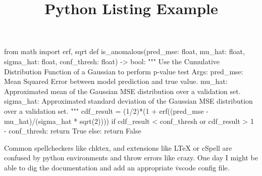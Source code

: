 \documentclass[11pt,a4paper]{scrartcl}
\title{Python Listing Example}
\begin{document}
\makeatletter
{\LARGE \textbf{\@title}}
\makeatother
\vspace{2.5em}


\begin{python}[caption={Simple p-value test in Python, assuming an underlying
    Gaussian distribution for model errors.},label={lst:python-p-test},aboveskip={\bigskipamount}]
    from math import erf, sqrt
    def is_anomalous(pred_mse: float, mu_hat: float, sigma_hat: float, conf_thresh: float) -> bool:
        """
        Use the Cumulative Distribution Function of a Gaussian to perform p-value test
        Args:
            pred_mse: Mean Squared Error between model prediction and true value.
            mu_hat: Approximated mean of the Gaussian MSE distribution over a validation set.
            sigma_hat: Approximated standard deviation of the Gaussian MSE distribution over a validation set.
        """
        cdf_result = (1/2)*(1 + erf((pred_mse - mu_hat)/(sigma_hat * sqrt(2))))
        if cdf_result < conf_thresh or cdf_result > 1 - conf_thresh:
            return True
        else:
            return False
\end{python}

Common spellcheckers like chktex, and extensions like LTeX or cSpell are confused
by python environments and throw errors like crazy. One day I might be able to
dig the documentation and add an appropriate \.vscode config file.
\end{document}
